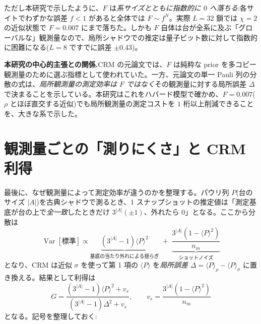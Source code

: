 \documentclass[11pt,a4paper]{ltjsarticle}
\newcommand{\ev}[1]{\langle #1\rangle}
\newcommand{\Var}{\operatorname{Var}}
\begin{document}
ただし本研究で示したように、$F$ は\emph{系サイズとともに指数的に $0$ へ落ちる}:各サイトでわずかな誤差 $f<1$ があると全体では $F\sim f^{N}$。実際 $L=32$ 鎖では $\chi=2$ の近似状態で $F=0.007$ にまで落ちた。しかも $F$ 自体は台が全系に及ぶ「グローバルな」観測量なので、局所シャドウでの推定は量子ビット数に対して指数的に困難になる($L=8$ ですでに誤差 $\pm0.43$)。

\begin{keybox}
\textbf{本研究の中心的主張との関係.}CRM の元論文では、$F$ は純粋な prior を多コピー観測量のために選ぶ指標として使われていた。一方、元論文の単一 Pauli 列の分散の式は、\emph{局所観測量の測定効率は $F$ ではなく}その観測量に対する局所誤差 $\Delta$ で決まることを示している。本研究はこれをハバード模型で確かめ、$F=0.007$($\rho$ とほぼ直交する近似)でも局所観測量の測定コストを $1$ 桁以上削減できることを、大きな系で示した。
\end{keybox}

\section{観測量ごとの「測りにくさ」と CRM 利得}
\label{sec:measure}

最後に、なぜ観測量によって測定効率が違うのかを整理する。パウリ列 $P$(台のサイズ $|A|$)を古典シャドウで測るとき、1 スナップショットの推定値は「測定基底が台の上で\emph{全一致}したときだけ $3^{|A|}(\pm1)$、外れたら $0$」となる。ここから分散は
\begin{equation}
  \Var[\text{標準}] \propto \underbrace{(3^{|A|}-1)\ev{P}^2}_{\text{基底の当たり外れによる揺らぎ}}
  \;+\;\underbrace{\frac{3^{|A|}(1-\ev{P}^2)}{n_m}}_{\text{ショットノイズ}}
\end{equation}
となり、CRM は近似 $\sigma$ を使って第 1 項の $\ev{P}$ を\emph{局所誤差} $\Delta=\ev{P}_\rho-\ev{P}_\sigma$ に置き換える。結果として利得は
\begin{equation}
  G = \frac{(3^{|A|}-1)\ev{P}^2+v_s}{(3^{|A|}-1)\Delta^2+v_s},
  \qquad v_s=\frac{3^{|A|}(1-\ev{P}^2)}{n_m}
\end{equation}
となる。記号を整理しておく:
\end{document}
